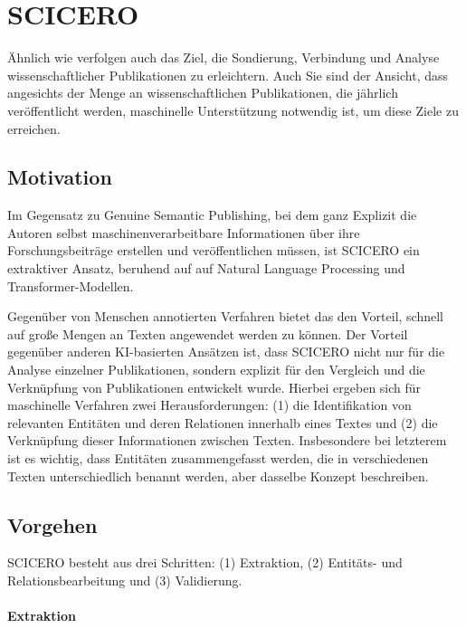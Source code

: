 \section{SCICERO}
\label{sec:scicero}

Ähnlich wie \citet{kuhn2017genuine} verfolgen auch \citet{DESSI2022109945} das Ziel, die Sondierung, Verbindung und Analyse wissenschaftlicher Publikationen zu erleichtern.
Auch Sie sind der Ansicht, dass angesichts der Menge an wissenschaftlichen Publikationen, die jährlich veröffentlicht werden, maschinelle Unterstützung notwendig ist, um diese Ziele zu erreichen.



\subsection{Motivation}

Im Gegensatz zu Genuine Semantic Publishing, bei dem ganz Explizit die Autoren selbst maschinenverarbeitbare Informationen über ihre Forschungsbeiträge erstellen und veröffentlichen müssen, ist SCICERO ein extraktiver Ansatz, beruhend auf auf Natural Language Processing und Transformer-Modellen.

Gegenüber von Menschen annotierten Verfahren bietet das den Vorteil, schnell auf große Mengen an Texten angewendet werden zu können.
Der Vorteil gegenüber anderen KI-basierten Ansätzen ist, dass SCICERO nicht nur für die Analyse einzelner Publikationen, sondern explizit für den Vergleich und die Verknüpfung von Publikationen entwickelt wurde.
Hierbei ergeben sich für maschinelle Verfahren zwei Herausforderungen: (1) die Identifikation von relevanten Entitäten und deren Relationen innerhalb eines Textes und (2) die Verknüpfung dieser Informationen zwischen Texten.
Insbesondere bei letzterem ist es wichtig, dass Entitäten zusammengefasst werden, die in verschiedenen Texten unterschiedlich benannt werden, aber dasselbe Konzept beschreiben.

\subsection{Vorgehen}

SCICERO besteht aus drei Schritten: (1) Extraktion, (2) Entitäts- und Relationsbearbeitung und (3) Validierung.

\paragraph{Extraktion}

